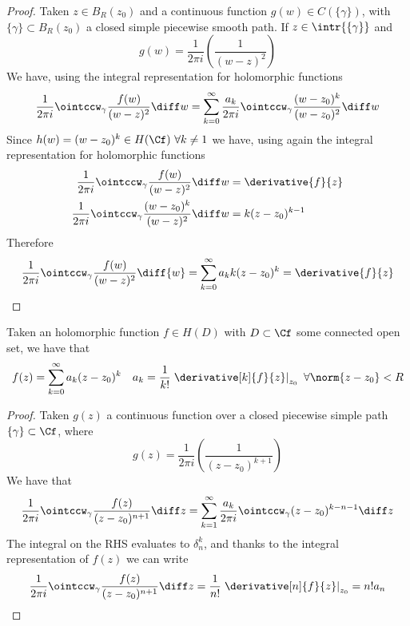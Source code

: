 \documentclass[../mmf.tex]{subfiles}
\begin{document}
\begin{proof}
	Taken $z\in B_R(z_0)$ and a continuous function $g(w)\in C(\{\gamma\})$, with $\{\gamma\}\subset B_R(z_0)$ a closed simple piecewise smooth path. If $z\in\intr{\{\gamma\}}$ and
	\begin{equation*}
		g(w)=\frac{1}{2\pi i}\left( \frac{1}{(w-z)^2} \right)
	\end{equation*}
	We have, using the integral representation for holomorphic functions
	\begin{equation*}
		\frac{1}{2\pi i}\ointccw_{\gamma}\frac{f(w)}{(w-z)^2}\diff w=\sum_{k=0}^\infty\frac{a_k}{2\pi i}\ointccw_{\gamma}\frac{(w-z_0)^k}{(w-z_0)^2}\diff w
	\end{equation*}
	Since $h(w)=(w-z_0)^k\in H(\Cf)\ \forall k\ne1$ we have, using again the integral representation for holomorphic functions
	\begin{equation*}
		\begin{aligned}
			\frac{1}{2\pi i}\ointccw_\gamma\frac{f(w)}{(w-z)^2}\diff w&=\derivative{f}{z}\\
			\frac{1}{2\pi i}\ointccw_\gamma\frac{(w-z_0)^k}{(w-z)^2}\diff w&=k(z-z_0)^{k-1}
		\end{aligned}
	\end{equation*}
	Therefore
	\begin{equation*}
		\frac{1}{2\pi i}\ointccw_\gamma\frac{f(w)}{(w-z)^2}\diff{w}=\sum_{k=0}^\infty a_kk(z-z_0)^k=\derivative{f}{z}
	\end{equation*}
\end{proof}
\begin{cor}
	Taken an holomorphic function $f\in H(D)$ with $D\subset\Cf$ some connected open set, we have that
	\begin{equation*}
		f(z)=\sum_{k=0}^{\infty}a_k(z-z_0)^k\quad a_k=\frac{1}{k!}\left.\derivative[k]{f}{z}\right|_{z_0}\ \forall\norm{z-z_0}<R
	\end{equation*}
\end{cor}
\begin{proof}
	Taken $g(z)$ a continuous function over a closed piecewise simple path $\{\gamma\}\subset\Cf$, where
	\begin{equation*}
		g(z)=\frac{1}{2\pi i}\left( \frac{1}{(z-z_0)^{k+1}} \right)
	\end{equation*}
	We have that
	\begin{equation*}
		\frac{1}{2\pi i}\ointccw_\gamma\frac{f(z)}{(z-z_0)^{n+1}}\diff z=\sum_{k=1}^{\infty}\frac{a_k}{2\pi i}\ointccw_\gamma(z-z_0)^{k-n-1}\diff z
	\end{equation*}
	The integral on the RHS evaluates to $\delta^k_n$, and thanks to the integral representation of $f(z)$ we can write
	\begin{equation*}
		\frac{1}{2\pi i}\ointccw_\gamma\frac{f(z)}{(z-z_0)^{n+1}}\diff z=\frac{1}{n!}\left.\derivative[n]{f}{z}\right|_{z_0}=n!a_n
	\end{equation*}
\end{proof}
\end{document}
